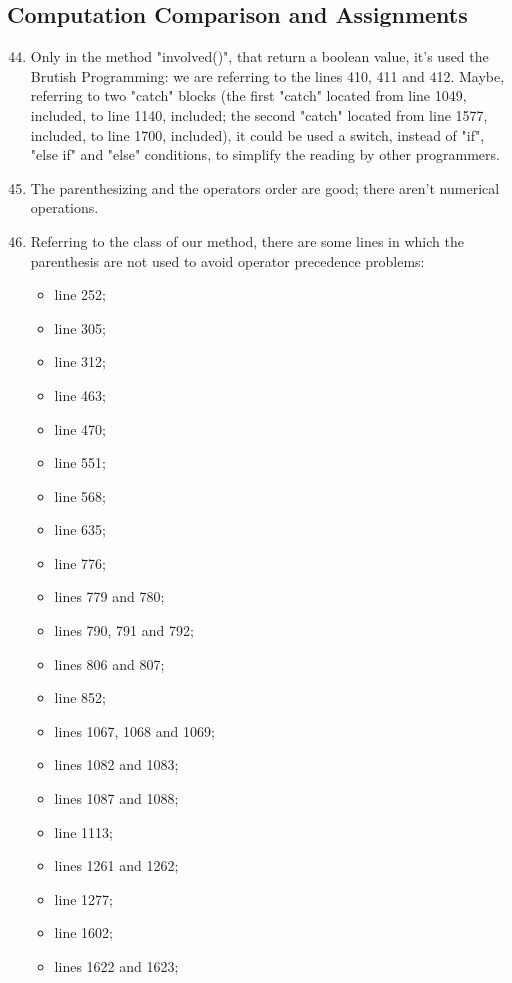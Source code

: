 \subsection{Computation Comparison and Assignments}
\begin{enumerate}
	\setcounter{enumi}{43}
	\item Only in the method "involved()", that return a boolean value, it's used the Brutish Programming: we are referring to the lines 410, 411 and 412. Maybe, referring to two "catch" blocks (the first "catch" located from line 1049, included, to line 1140, included; the second "catch" located from line 1577, included, to line 1700, included), it could be used a switch, instead of "if", "else if" and "else" conditions, to simplify the reading by other programmers. 
	\item The parenthesizing and the operators order are good; there aren't numerical operations.
	\item Referring to the class of our method, there are some lines in which the parenthesis are not used to avoid operator precedence problems:
	    \begin{itemize}
	        \item line 252;
	        \item line 305;
	        \item line 312;
	        \item line 463;
	        \item line 470;
	        \item line 551;
	        \item line 568;
	        \item line 635;
	        \item line 776;
	        \item lines 779 and 780;
	        \item lines 790, 791 and 792;
	        \item lines 806 and 807;
	        \item line 852;
	        \item lines 1067, 1068 and 1069;
	        \item lines 1082 and 1083;
	        \item lines 1087 and 1088;
	        \item line 1113;
	        \item lines 1261 and 1262;
	        \item line 1277;
	        \item line 1602;
	        \item lines 1622 and 1623;

\end{itemize}
\end{enumerate}
